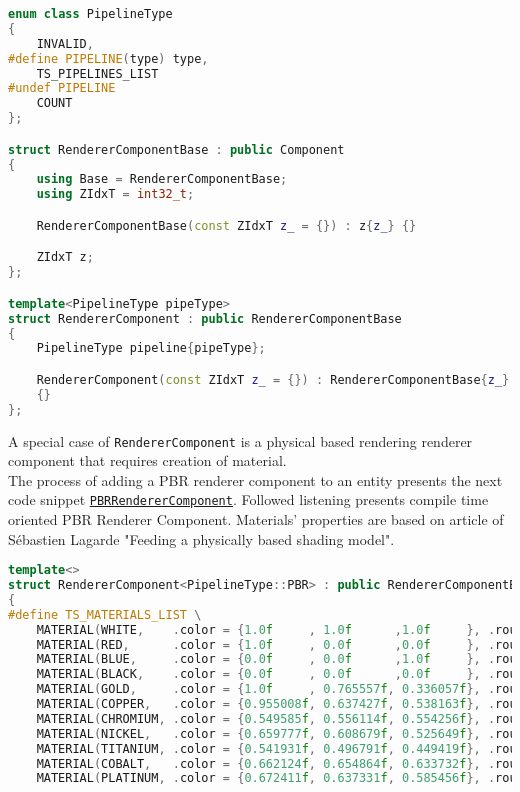 \begin{itemize}
\begin{lstlisting}[language=c++, caption=Renderer Component struct (./engine/include/tsengine/ecs/components/renderer\_component.h)]
enum class PipelineType
{
    INVALID,
#define PIPELINE(type) type, 
    TS_PIPELINES_LIST
#undef PIPELINE
    COUNT
};

struct RendererComponentBase : public Component
{
    using Base = RendererComponentBase;
    using ZIdxT = int32_t;

    RendererComponentBase(const ZIdxT z_ = {}) : z{z_} {}

    ZIdxT z;
};

template<PipelineType pipeType>
struct RendererComponent : public RendererComponentBase 
{
    PipelineType pipeline{pipeType};

    RendererComponent(const ZIdxT z_ = {}) : RendererComponentBase{z_}
    {}
};
\end{lstlisting}

A special case of \texttt{RendererComponent} is a physical based rendering renderer component that requires creation of material.\\
The process of adding a PBR renderer component to an entity presents the next code snippet \hyperref[lst:renderer_component_pbr]{\texttt{PBRRendererComponent}}.
Followed listening presents compile time oriented PBR Renderer Component. Materials' properties are based on article of Sébastien Lagarde "Feeding a physically based shading model"\cite{feedingpbr}. %
\begin{lstlisting}[language=c++, caption=Renderer PBR Component struct (./engine/include/tsengine/ecs/components/renderer\_component.h)]
template<>
struct RendererComponent<PipelineType::PBR> : public RendererComponentBase
{
#define TS_MATERIALS_LIST \
    MATERIAL(WHITE,    .color = {1.0f     , 1.0f      ,1.0f     }, .roughness = 0.5f, .metallic = 1.0f) \
    MATERIAL(RED,      .color = {1.0f     , 0.0f      ,0.0f     }, .roughness = 0.5f, .metallic = 1.0f) \
    MATERIAL(BLUE,     .color = {0.0f     , 0.0f      ,1.0f     }, .roughness = 0.5f, .metallic = 1.0f) \
    MATERIAL(BLACK,    .color = {0.0f     , 0.0f      ,0.0f     }, .roughness = 0.5f, .metallic = 1.0f) \
    MATERIAL(GOLD,     .color = {1.0f     , 0.765557f, 0.336057f}, .roughness = 0.5f, .metallic = 1.0f) \
    MATERIAL(COPPER,   .color = {0.955008f, 0.637427f, 0.538163f}, .roughness = 0.5f, .metallic = 1.0f) \
    MATERIAL(CHROMIUM, .color = {0.549585f, 0.556114f, 0.554256f}, .roughness = 0.5f, .metallic = 1.0f) \
    MATERIAL(NICKEL,   .color = {0.659777f, 0.608679f, 0.525649f}, .roughness = 0.5f, .metallic = 1.0f) \
    MATERIAL(TITANIUM, .color = {0.541931f, 0.496791f, 0.449419f}, .roughness = 0.5f, .metallic = 1.0f) \
    MATERIAL(COBALT,   .color = {0.662124f, 0.654864f, 0.633732f}, .roughness = 0.5f, .metallic = 1.0f) \
    MATERIAL(PLATINUM, .color = {0.672411f, 0.637331f, 0.585456f}, .roughness = 0.5f, .metallic = 1.0f) \


\end{lstlisting}
\end{itemize}
